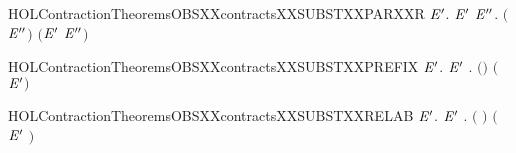 \newcommand{\HOLContractionTheoremsOBSXXcontractsXXSUBSTXXPARXXL}{\UseVerbatim{HOLContractionTheoremsOBSXXcontractsXXSUBSTXXPARXXL}}
\begin{SaveVerbatim}{HOLContractionTheoremsOBSXXcontractsXXSUBSTXXPARXXR}
\HOLTokenTurnstile{} \HOLSymConst{\HOLTokenForall{}} \ensuremath{\HOLBoundVar{E}\sp{\prime{}}}.
       \ensuremath{\HOLBoundVar{E}\sp{\prime{}}} \HOLSymConst{\HOLTokenImp{}}
     \HOLSymConst{\HOLTokenForall{}}\ensuremath{\HOLBoundVar{E}\sp{\prime{}\prime{}}}.  \ensuremath{(} \HOLSymConst{\ensuremath{\mid}} \ensuremath{\HOLBoundVar{E}\sp{\prime{}\prime{}}}\ensuremath{)} \ensuremath{(}\ensuremath{\HOLBoundVar{E}\sp{\prime{}}} \HOLSymConst{\ensuremath{\mid}} \ensuremath{\HOLBoundVar{E}\sp{\prime{}\prime{}}}\ensuremath{)}
\end{SaveVerbatim}
\newcommand{\HOLContractionTheoremsOBSXXcontractsXXSUBSTXXPARXXR}{\UseVerbatim{HOLContractionTheoremsOBSXXcontractsXXSUBSTXXPARXXR}}
\begin{SaveVerbatim}{HOLContractionTheoremsOBSXXcontractsXXSUBSTXXPREFIX}
\HOLTokenTurnstile{} \HOLSymConst{\HOLTokenForall{}} \ensuremath{\HOLBoundVar{E}\sp{\prime{}}}.   \ensuremath{\HOLBoundVar{E}\sp{\prime{}}} \HOLSymConst{\HOLTokenImp{}} \HOLSymConst{\HOLTokenForall{}}.  \ensuremath{(}\HOLSymConst{\ensuremath{\ldotp}}\ensuremath{)} \ensuremath{(}\HOLSymConst{\ensuremath{\ldotp}}\ensuremath{\HOLBoundVar{E}\sp{\prime{}}}\ensuremath{)}
\end{SaveVerbatim}
\newcommand{\HOLContractionTheoremsOBSXXcontractsXXSUBSTXXPREFIX}{\UseVerbatim{HOLContractionTheoremsOBSXXcontractsXXSUBSTXXPREFIX}}
\begin{SaveVerbatim}{HOLContractionTheoremsOBSXXcontractsXXSUBSTXXRELAB}
\HOLTokenTurnstile{} \HOLSymConst{\HOLTokenForall{}} \ensuremath{\HOLBoundVar{E}\sp{\prime{}}}.
       \ensuremath{\HOLBoundVar{E}\sp{\prime{}}} \HOLSymConst{\HOLTokenImp{}}
     \HOLSymConst{\HOLTokenForall{}}.  \ensuremath{(}  \ensuremath{)} \ensuremath{(} \ensuremath{\HOLBoundVar{E}\sp{\prime{}}} \ensuremath{)}
\end{SaveVerbatim}
\newcommand{\HOLContractionTheoremsOBSXXcontractsXXSUBSTXXRELAB}{\UseVerbatim{HOLContractionTheoremsOBSXXcontractsXXSUBSTXXRELAB}}
